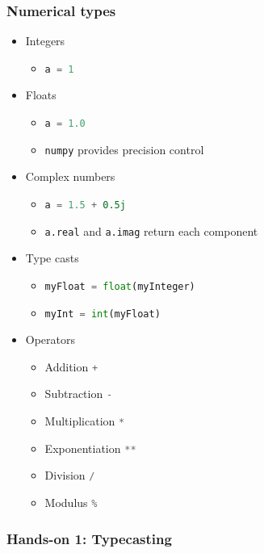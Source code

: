\documentclass[xcolor=table,10pt,final]{beamer}
\begin{document}
\begin{frame}[fragile]
  \frametitle{Numerical types}
  \begin{itemize}
    \item Integers
      \begin{itemize}
        \item \lstinline[language=python]|a = 1|
      \end{itemize}
    \item Floats
      \begin{itemize}
        \item \lstinline[language=python]|a = 1.0|
        \item {\tt numpy} provides precision control
      \end{itemize}
    \item Complex numbers
      \begin{itemize}
        \item \lstinline[language=python]|a = 1.5 + 0.5j|
        \item \lstinline[language=python]|a.real| and \lstinline[language=python]|a.imag| return each component
      \end{itemize}
    \item Type casts
      \begin{itemize}
        \item \lstinline[language=python]|myFloat = float(myInteger)|
        \item \lstinline[language=python]|myInt = int(myFloat)|
      \end{itemize}
    \item Operators
      \begin{itemize}
        \item Addition \lstinline[language=python]|+|
        \item Subtraction \lstinline[language=python]|-|
        \item Multiplication \lstinline[language=python]|*|
        \item Exponentiation \lstinline[language=python]|**|
        \item Division \lstinline[language=python]|/|
        \item Modulus \lstinline[language=python]|%|
      \end{itemize}
  \end{itemize}
\end{frame}

\begin{frame}
  \frametitle{Hands-on 1: Typecasting}
\end{frame}
\end{document}
